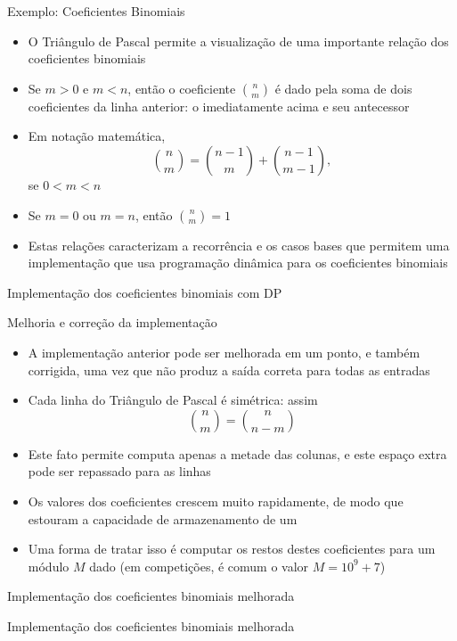\begin{frame}[fragile]{Exemplo: Coeficientes Binomiais}

    \begin{itemize}
        \item O Triângulo de Pascal permite a visualização de uma importante relação dos
            coeficientes binomiais

        \item Se $m > 0$ e $m < n$, então o coeficiente $\binom{n}{m}$ é dado pela soma de
            dois coeficientes da linha anterior: o imediatamente acima e seu antecessor

        \item Em notação matemática,
        \[
            \binom{n}{m} = \binom{n - 1}{m} + \binom{n - 1}{m - 1},
        \]
        se $0 < m < n$

        \item Se $m = 0$ ou $m = n$, então $\binom{n}{m} = 1$

        \item Estas relações caracterizam a recorrência e os casos bases que permitem uma
            implementação que usa programação dinâmica para os coeficientes binomiais
    \end{itemize}

\end{frame}

\begin{frame}[fragile]{Implementação dos coeficientes binomiais com DP}
\end{frame}

\begin{frame}[fragile]{Melhoria e correção da implementação}

    \begin{itemize}
        \item A implementação anterior pode ser melhorada em um ponto, e também corrigida,
            uma vez que não produz a saída correta para todas as entradas

        \item Cada linha do Triângulo de Pascal é simétrica: assim
        \[
            \binom{n}{m} = \binom{n}{n - m}
        \]

        \item Este fato permite computa apenas a metade das colunas, e este espaço extra pode
            ser repassado para as linhas

        \item Os valores dos coeficientes crescem muito rapidamente, de modo que estouram a
            capacidade de armazenamento de um 

        \item Uma forma de tratar isso é computar os restos destes coeficientes para um módulo
            $M$ dado (em competições, é comum o valor $M = 10^9 + 7$)
    \end{itemize}

\end{frame}

\begin{frame}[fragile]{Implementação dos coeficientes binomiais melhorada}
\end{frame}

\begin{frame}[fragile]{Implementação dos coeficientes binomiais melhorada}
\end{frame}

